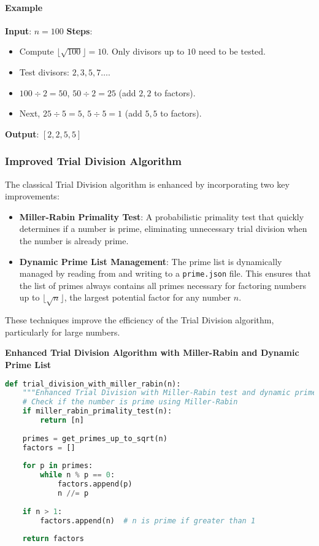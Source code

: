 \documentclass[12pt]{report}
\begin{document}
\paragraph{Example}  
\textbf{Input}: $n = 100$  
\textbf{Steps}:  
\begin{itemize}
    \item Compute $\lfloor \sqrt{100} \rfloor = 10$. Only divisors up to $10$ need to be tested.  
    \item Test divisors: $2, 3, 5, 7 \ldots$.  
    \item $100 \div 2 = 50$, $50 \div 2 = 25$ (add $2, 2$ to factors).  
    \item Next, $25 \div 5 = 5$, $5 \div 5 = 1$ (add $5, 5$ to factors).  
\end{itemize}  
\textbf{Output}: $[2, 2, 5, 5]$  

\subsubsection{Improved Trial Division Algorithm}

The classical Trial Division algorithm is enhanced by incorporating two key improvements:
\begin{itemize}
    \item \textbf{Miller-Rabin Primality Test}: A probabilistic primality test that quickly determines if a number is prime, eliminating unnecessary trial division when the number is already prime.
    \item \textbf{Dynamic Prime List Management}: The prime list is dynamically managed by reading from and writing to a \texttt{prime.json} file. This ensures that the list of primes always contains all primes necessary for factoring numbers up to $\lfloor \sqrt{n} \rfloor$, the largest potential factor for any number $n$.
\end{itemize}

These techniques improve the efficiency of the Trial Division algorithm, particularly for large numbers.

\begin{center}
    \textbf{Enhanced Trial Division Algorithm with Miller-Rabin and Dynamic Prime List}
\end{center}

\begin{lstlisting}[language=Python]
def trial_division_with_miller_rabin(n):
    """Enhanced Trial Division with Miller-Rabin test and dynamic prime list."""
    # Check if the number is prime using Miller-Rabin
    if miller_rabin_primality_test(n):
        return [n]
    
    primes = get_primes_up_to_sqrt(n)
    factors = []
    
    for p in primes:
        while n % p == 0:
            factors.append(p)
            n //= p
    
    if n > 1:
        factors.append(n)  # n is prime if greater than 1
    
    return factors
\end{lstlisting}
\end{document}

